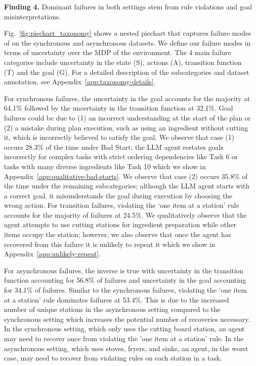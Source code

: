 \textbf{Finding 4.} Dominant failures in both settings stem from rule violations and goal misinterpretations.

Fig.~\ref{fig:piechart_taxonomy} shows a nested piechart that captures failure modes of \gptfo{} \react{} on the synchronous and asynchronous datasets. We define our failure modes in terms of uncertainty over the MDP of the environment. The 4 main failure categories include uncertainty in the state (S), actions (A), transition function (T) and the goal (G). For a detailed description of the subcategories and dataset annotation, see Appendix~\ref{app:taxonomy-details}.

For synchronous failures, the uncertainty in the goal accounts for the majority at 64.1\% followed by the uncertainty in the transition function at 32.1\%. Goal failures could be due to (1) an incorrect understanding at the start of the plan or (2) a mistake during plan execution, such as using an ingredient without cutting it, which is incorrectly believed to satisfy the goal. We observe that case (1) occurs 28.3\% of the time under Bad Start; the LLM agent restates goals incorrectly for complex tasks with strict ordering dependencies like Task 6 or tasks with many diverse ingredients like Task 10 which we show in Appendix~\ref{app:qualitative-bad-starts}. We observe that case (2) occurs 35.8\% of the time under the remaining subcategories; although the LLM agent starts with a correct goal, it misunderstands the goal during execution by choosing the wrong action.
For transition failures, violating the `one item at a station' rule accounts for the majority of failures at 24.5\%. We qualitatively observe that the agent attempts to use cutting stations for ingredient preparation while other items occupy the station; however, we also observe that once the agent has recovered from this failure it is unlikely to repeat it which we show in Appendix~\ref{app:unlikely-repeat}.



For asynchronous failures, the inverse is true with uncertainty in the transition function accounting for 56.8\% of failures and uncertainty in the goal accounting for 34.1\% of failures. Similar to the synchronous failures, violating the `one item at a station' rule dominates failures at 53.4\%. This is due to the increased number of unique stations in the asynchronous setting compared to the synchronous setting which increases the potential number of recoveries necessary. In the synchronous setting, which only uses the cutting board station, an agent may need to recover once from violating the 'one item at a station' rule. In the asynchronous setting, which uses stoves, fryers, and sinks, an agent, in the worst case, may need to recover from violating rules on each station in a task.

